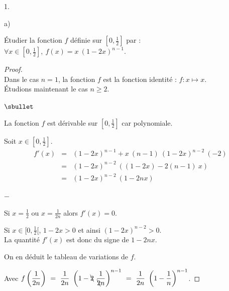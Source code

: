 \begin{noliste}{1.}
\item 
  \begin{noliste}{a)} 
    \setlength{\itemsep}{2mm}
  \item Étudier la fonction $f$ définie sur $\left[0, \frac{1}{2}
    \right]$ par : $\forall x \in \left[0, \frac{1}{2} \right], \ f(x)
    = x \ (1-2x)^{n-1}$.

    \begin{proof}~\\%
      Dans le cas $n = 1$, la fonction $f$ est la fonction identité :
      $f : x \mapsto x$.\\
      Étudions maintenant le cas $n \geq 2$.
      \begin{noliste}{$\sbullet$}
      \item La fonction $f$ est dérivable sur $[0, \frac{1}{2}]$ car
        polynomiale.

      \item Soit $x \in [0, \frac{1}{2}]$.
        \[
        \begin{array}{rcl}
          f'(x) & = & (1-2x)^{n-1} + x \ (n-1) \ (1-2x)^{n-2} \ (-2)
          \\[.2cm]
          & = & (1-2x)^{n-2} \ \left( (1 - 2x) - 2 (n-1) \ x \right)
          \\[.2cm]
          & = & (1-2x)^{n-2} \ \left( 1 - 2 n x \right)
        \end{array}
        \]
        \begin{noliste}{$-$}
        \item Si $x = \frac{1}{2}$ ou $x = \frac{1}{2n}$ alors $f'(x)
          = 0$.
        \item Si $x \in [0, \frac{1}{2}[$, $1 - 2x > 0$ et ainsi
          $(1-2x)^{n-2} > 0$.\\
          La quantité $f'(x)$ est donc du signe de $1 - 2 n x$.
        \end{noliste}

      \item On en déduit le tableau de variations de $f$.\\[-.2cm]
        \begin{center}
        \end{center}
      \end{noliste}
      Avec $f\left( \dfrac{1}{2n} \right) \ = \ \dfrac{1}{2n} \
      \left(1 - \bcancel{2} \ \dfrac{1}{\bcancel{2}n} \right)^{n-1} \
      = \ \dfrac{1}{2n} \ \left(1 - \dfrac{1}{n} \right)^{n-1}$.



\end{proof}
\end{noliste}
\end{noliste}
